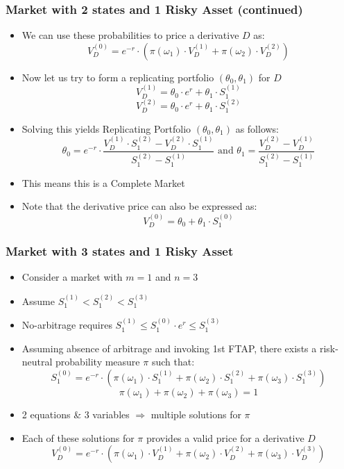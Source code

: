 \documentclass{beamer}
\begin{document}
\begin{frame}
\frametitle{Market with 2 states and 1 Risky Asset (continued)}
\begin{itemize}
\item We can use these probabilities to price a derivative $D$ as:
$$V_D^{(0)} = e^{-r} \cdot (\pi(\omega_1) \cdot V_D^{(1)} + \pi(\omega_2) \cdot V_D^{(2)})$$
\item Now let us try to form a replicating portfolio $(\theta_0, \theta_1)$ for $D$
$$V_D^{(1)} = \theta_0 \cdot e^r + \theta_1 \cdot S_1^{(1)}$$
$$V_D^{(2)} = \theta_0 \cdot e^r + \theta_1 \cdot S_1^{(2)}$$ 
\item Solving this yields Replicating  Portfolio $(\theta_0, \theta_1)$ as follows:
$$\theta_0 = e^{-r} \cdot \frac {V_D^{(1)} \cdot S_1^{(2)} - V_D^{(2)} \cdot S_1^{(1)}} {S_1^{(2)} - S_1^{(1)}} \mbox{ and } \theta_1 = \frac {V_D^{(2)} - V_D^{(1)}} {S_1^{(2)} - S_1^{(1)}}$$
\item This means this is a Complete Market
\item Note that the derivative price can also be expressed as:
$$V_D^{(0)} = \theta_0 + \theta_1 \cdot S_1^{(0)}$$ 
\end{itemize}
\end{frame}

\begin{frame}
\frametitle{Market with 3 states and 1 Risky Asset}
\begin{itemize}
\item Consider a market with $m = 1$ and $n = 3$
\item Assume $S_1^{(1)} < S_1^{(2)} < S_1^{(3)}$
\item No-arbitrage requires $S_1^{(1)} \leq S_1^{(0)} \cdot e^r \leq S_1^{(3)}$
\item Assuming absence of arbitrage and invoking 1st FTAP, there exists a risk-neutral probability measure $\pi$ such that:
$$S_1^{(0)} = e^{-r} \cdot (\pi(\omega_1) \cdot S_1^{(1)} + \pi(\omega_2) \cdot S_1^{(2)} + \pi(\omega_3) \cdot S_1^{(3)})$$
$$\pi(\omega_1) + \pi(\omega_2) + \pi(\omega_3) = 1$$
\item 2 equations \& 3 variables $\Rightarrow$ multiple solutions for $\pi$
\item Each of these solutions for $\pi$ provides a valid price for a derivative $D$
$$V_D^{(0)} = e^{-r} \cdot (\pi(\omega_1) \cdot V_D^{(1)} + \pi(\omega_2) \cdot V_D^{(2)} + \pi(\omega_3) \cdot V_D^{(3)})$$
\end{itemize}
\end{frame}
\end{document}
